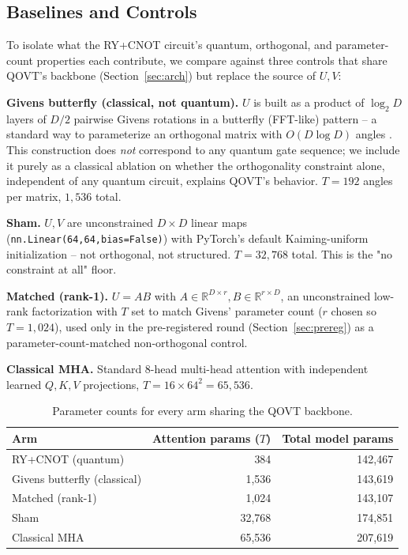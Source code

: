 \documentclass[10pt,letterpaper]{article}
\theoremstyle{plain}
\theoremstyle{definition}
\begin{document}
\subsection{Baselines and Controls}
\label{sec:controls}

To isolate what the RY+CNOT circuit's quantum, orthogonal, and
parameter-count properties each contribute, we compare against three
controls that share QOVT's backbone (Section~\ref{sec:arch}) but replace
the source of $U,V$:

\textbf{Givens butterfly (classical, not quantum).} $U$ is built as a
product of $\log_2 D$ layers of $D/2$ pairwise Givens rotations in a
butterfly (FFT-like) pattern -- a standard way to parameterize an
orthogonal matrix with $O(D\log D)$ angles \citep{cherrat2022}. This
construction does \emph{not} correspond to any quantum gate sequence; we
include it purely as a classical ablation on whether the orthogonality
constraint alone, independent of any quantum circuit, explains QOVT's
behavior. $T{=}192$ angles per matrix, $1{,}536$ total.

\textbf{Sham.} $U,V$ are unconstrained $D{\times}D$ linear maps
(\texttt{nn.Linear(64,64,bias=False)}) with PyTorch's default
Kaiming-uniform initialization -- not orthogonal, not structured. $T{=}32{,}768$
total. This is the "no constraint at all" floor.

\textbf{Matched (rank-1).} $U = AB$ with $A\in\mathbb{R}^{D\times r},
B\in\mathbb{R}^{r\times D}$, an unconstrained low-rank factorization with
$T$ set to match Givens' parameter count ($r$ chosen so $T{=}1{,}024$),
used only in the pre-registered round (Section~\ref{sec:prereg}) as a
parameter-count-matched non-orthogonal control.

\textbf{Classical MHA.} Standard 8-head multi-head attention with
independent learned $Q,K,V$ projections, $T{=}16\times 64^2=65{,}536$.

\begin{table}[h]
\centering\small
\begin{tabular}{@{}lrr@{}}
\toprule
Arm & Attention params ($T$) & Total model params \\
\midrule
RY+CNOT (quantum) & 384 & 142,467 \\
Givens butterfly (classical) & 1,536 & 143,619 \\
Matched (rank-1) & 1,024 & 143,107 \\
Sham & 32,768 & 174,851 \\
Classical MHA & 65,536 & 207,619 \\
\bottomrule
\end{tabular}
\caption{Parameter counts for every arm sharing the QOVT backbone.}
\label{tab:params}
\end{table}
\end{document}
